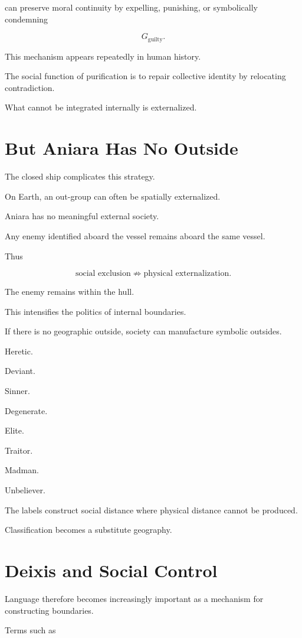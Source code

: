 \documentclass[11pt,oneside]{book}
\theoremstyle{definition}
\theoremstyle{remark}
\begin{document}
can preserve moral continuity by expelling, punishing, or symbolically condemning

\[
G_{\mathrm{guilty}}.
\]

This mechanism appears repeatedly in human history.

The social function of purification is to repair collective identity by relocating contradiction.

What cannot be integrated internally is externalized.

\section{But Aniara Has No Outside}

The closed ship complicates this strategy.

On Earth, an out-group can often be spatially externalized.

Aniara has no meaningful external society.

Any enemy identified aboard the vessel remains aboard the same vessel.

Thus

\[
\text{social exclusion}
\not\Rightarrow
\text{physical externalization}.
\]

The enemy remains within the hull.

This intensifies the politics of internal boundaries.

If there is no geographic outside, society can manufacture symbolic outsides.

Heretic.

Deviant.

Sinner.

Degenerate.

Elite.

Traitor.

Madman.

Unbeliever.

The labels construct social distance where physical distance cannot be produced.

Classification becomes a substitute geography.

\section{Deixis and Social Control}

Language therefore becomes increasingly important as a mechanism for constructing boundaries.

Terms such as
\end{document}
